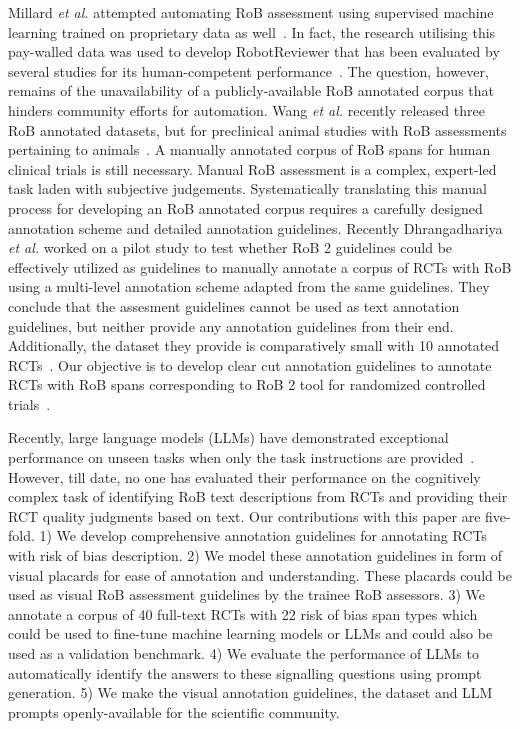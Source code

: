 \documentclass[sn-mathphys,Numbered]{sn-jnl}%
\theoremstyle{thmstyleone}%
\theoremstyle{thmstyletwo}%
\theoremstyle{thmstylethree}%
\begin{document}
Millard \textit{et al.} attempted automating RoB assessment using supervised machine learning trained on proprietary data as well~\cite{millard2016machine}.
In fact, the research utilising this pay-walled data was used to develop RobotReviewer that has been evaluated by several studies for its human-competent performance~\cite{marshall2016robotreviewer,soboczenski2019machine,vinkers2021methodological,jardim2022automating,hirt2021agreement}.
The question, however, remains of the unavailability of a publicly-available RoB annotated corpus that hinders community efforts for automation. 
Wang \textit{et al.} recently released three RoB annotated datasets, but for preclinical animal studies with RoB assessments pertaining to animals~\cite{wang2022risk}.
A manually annotated corpus of RoB spans for human clinical trials is still necessary.
Manual RoB assessment is a complex, expert-led task laden with subjective judgements.
Systematically translating this manual process for developing an RoB annotated corpus requires a carefully designed annotation scheme and detailed annotation guidelines.
Recently Dhrangadhariya \textit{et al.} worked on a pilot study to test whether RoB 2 guidelines could be effectively utilized as guidelines to manually annotate a corpus of RCTs with RoB using a multi-level annotation scheme adapted from the same guidelines.
They conclude that the assesment guidelines cannot be used as text annotation guidelines, but neither provide any annotation guidelines from their end.
Additionally, the dataset they provide is comparatively small with 10 annotated RCTs~\cite{dhrangadhariya2023first}.
Our objective is to develop clear cut annotation guidelines to annotate RCTs with RoB spans corresponding to RoB 2 tool for randomized controlled trials~\cite{sterne2019rob}.



Recently, large language models (LLMs) have demonstrated exceptional performance on unseen tasks when only the task instructions are provided~\cite{chang2023survey}.
However, till date, no one has evaluated their performance on the cognitively complex task of identifying RoB text descriptions from RCTs and providing their RCT quality judgments based on text.
Our contributions with this paper are five-fold. 
1) We develop comprehensive annotation guidelines for annotating RCTs with risk of bias description.
2) We model these annotation guidelines in form of visual placards for ease of annotation and understanding. These placards could be used as visual RoB assessment guidelines by the trainee RoB assessors.
3) We annotate a corpus of 40 full-text RCTs with 22 risk of bias span types which could be used to fine-tune machine learning models or LLMs and could also be used as a validation benchmark.
4) We evaluate the performance of LLMs to automatically identify the answers to these signalling questions using prompt generation.
5) We make the visual annotation guidelines, the dataset and LLM prompts openly-available for the scientific community.
%
%
%
\end{document}

